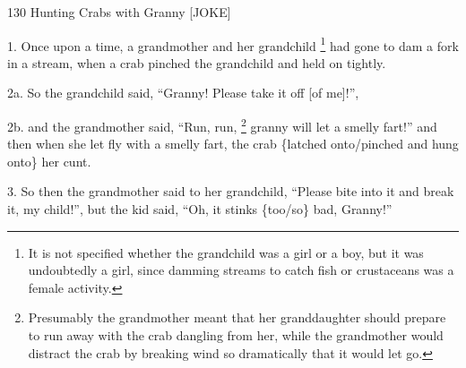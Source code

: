 
130 Hunting Crabs with Granny [JOKE]

1. Once upon a time, a grandmother and her grandchild \footnote{It is not specified whether the grandchild was a girl or a boy, but it was undoubtedly a girl, since damming streams to catch fish or crustaceans was a female activity.} had gone to dam a fork
in a stream, when a crab pinched the grandchild and held on tightly.

2a. So the grandchild said, ``Granny! Please take it off [of me]!'',

2b. and the grandmother said, ``Run, run, \footnote{Presumably the grandmother meant that her granddaughter should prepare to run away with the crab dangling from her, while the grandmother would distract the crab by breaking wind so dramatically that it would let go.} granny will let a smelly fart!''
and then when she let fly with a smelly fart, the crab \{latched onto/pinched and
hung onto\} her cunt.

3. So then the grandmother said to her grandchild, ``Please bite into it and break
it, my child!'', but the kid said, ``Oh, it stinks \{too/so\} bad, Granny!''


